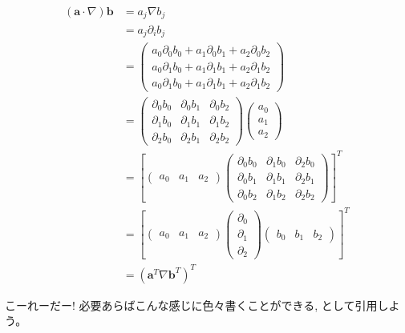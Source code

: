 \begin{align}
\left(\bm{a}\cdot\nabla\right)\bm{b}
&=a_j\nabla b_j\\
&=a_j\partial_i b_j\\
&=
\left(
\begin{array}{c}
a_0\partial_0 b_0 +
a_1\partial_0 b_1 +
a_2\partial_0 b_2 \\
a_0\partial_1 b_0 +
a_1\partial_1 b_1 +
a_2\partial_1 b_2 \\
a_0\partial_1 b_0 +
a_1\partial_1 b_1 +
a_2\partial_1 b_2
\end{array}
\right)\\
&=
\left(
\begin{array}{ccc}
\partial_0 b_0 &
\partial_0 b_1 &
\partial_0 b_2 \\
\partial_1 b_0 &
\partial_1 b_1 &
\partial_1 b_2 \\
\partial_2 b_0 &
\partial_2 b_1 &
\partial_2 b_2
\end{array}
\right)
\left(
\begin{array}{c}
a_0\\a_1\\a_2\end{array}
\right)\\
&=
\left[
\left(
\begin{array}{ccc}a_0 & a_1 & a_2\end{array}
\right)
\left(
\begin{array}{ccc}
\partial_0 b_0 &
\partial_1 b_0 &
\partial_2 b_0 \\
\partial_0 b_1 &
\partial_1 b_1 &
\partial_2 b_1 \\
\partial_0 b_2 &
\partial_1 b_2 &
\partial_2 b_2
\end{array}
\right)
\right]^T\\
&=
\left[
\left(
\begin{array}{ccc}a_0 & a_1 & a_2\end{array}
\right)
\left(
\begin{array}{c}
\partial_0 \\
\partial_1 \\
\partial_2
\end{array}
\right)
\left(
\begin{array}{ccc}b_0 & b_1 & b_2\end{array}
\right)
\right]^T\\
&=\left(\bm{a}^T\nabla\bm{b}^T\right)^T
\end{align}

こーれーだー! 必要あらばこんな感じに色々書くことができる,
として引用しよう。

